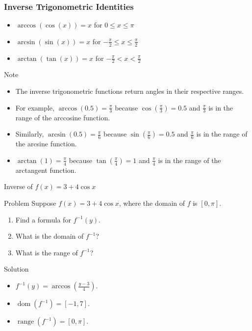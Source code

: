 \begin{frame}
    \frametitle{Inverse Trigonometric Identities}
    \begin{itemize}
        \item \(\arccos(\cos(x)) = x\) for \(0 \leq x \leq \pi\)
        \item \(\arcsin(\sin(x)) = x\) for \(-\frac{\pi}{2} \leq x \leq \frac{\pi}{2}\)
        \item \(\arctan(\tan(x)) = x\) for \(-\frac{\pi}{2} < x < \frac{\pi}{2}\)
    \end{itemize}
    \begin{block}{Note}
        \begin{itemize}
            \item The inverse trigonometric functions return angles in their respective ranges.
            \item For example, \(\arccos(0.5) = \frac{\pi}{3}\) because \(\cos(\frac{\pi}{3}) = 0.5\) and \(\frac{\pi}{3}\) is in the range of the arccosine function.
            \item Similarly, \(\arcsin(0.5) = \frac{\pi}{6}\) because \(\sin(\frac{\pi}{6}) = 0.5\) and \(\frac{\pi}{6}\) is in the range of the arcsine function.
            \item \(\arctan(1) = \frac{\pi}{4}\) because \(\tan(\frac{\pi}{4}) = 1\) and \(\frac{\pi}{4}\) is in the range of the arctangent function.
        \end{itemize}
    \end{block} 
\end{frame}


\begin{frame}{Inverse of $f(x)=3+4\cos x$}
  \begin{block}{Problem}
    Suppose $f(x)=3+4\cos x$, where the domain of $f$ is $[0,\pi]$.
    \begin{enumerate}[]
      \item Find a formula for $f^{-1}(y)$.
      \item What is the domain of $f^{-1}$?
      \item What is the range of $f^{-1}$?
    \end{enumerate}
  \end{block}
  \begin{block}{Solution}
    \begin{itemize}
      \item $f^{-1}(y)=\arccos\left(\frac{y-3}{4}\right)$.
      \item $\operatorname{dom}(f^{-1})=[-1,7]$.
      \item $\operatorname{range}(f^{-1})=[0,\pi]$.
    \end{itemize}
  \end{block}
\end{frame}


